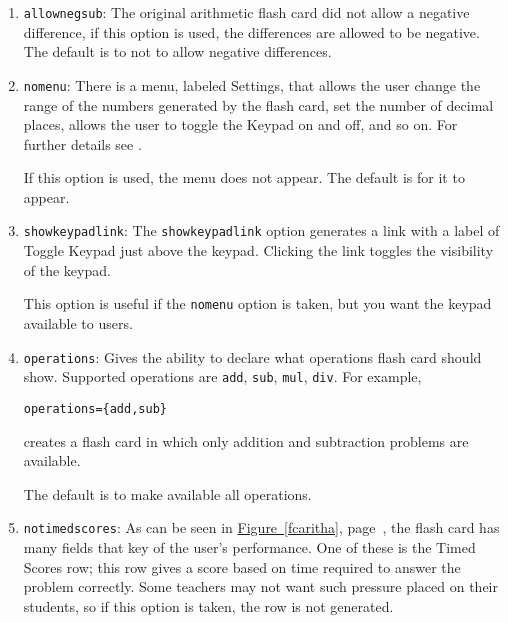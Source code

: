 \documentclass{article}
\let\uif\textsf
\begin{document}
\begin{enumerate}

\item\texttt{allownegsub}: The original arithmetic flash card did not allow
    a negative difference, if this option is used, the differences are
    allowed to be negative. The default is to not to allow negative
    differences.

\item \texttt{nomenu}: There is a menu, labeled \uif{Settings},
    that allows the user change the range of the numbers generated by the
    flash card, set the number of decimal places, allows the user to toggle
    the \uif{Keypad} on and off, and so on. For further details
    see .

     If this option is used, the menu does not appear. The default is for it to appear.

\item \texttt{showkeypadlink}: The \texttt{showkeypadlink} option generates
    a link with a label of \uif{Toggle Keypad} just above the
    keypad. Clicking the link toggles the visibility of the keypad.

    This option is useful if the \texttt{nomenu} option is taken, but
    you want the keypad available to users.

\item \texttt{operations}: Gives the ability to declare what operations
    flash card should show. Supported operations are \texttt{add},
    \texttt{sub}, \texttt{mul}, \texttt{div}. For example,
\begin{Verbatim}[xleftmargin=\amtIndent]
operations={add,sub}
\end{Verbatim}
    creates a flash card in which only addition and subtraction problems
    are available.

    The default is to make available all operations.


\item \texttt{notimedscores}: As can be seen in
    \hyperref[fcaritha]{Figure~\ref*{fcaritha}}, page~\pageref*{fcaritha},
    the flash card has many fields that key of the user's performance. One
    of these is the \uif{Timed Scores} row; this row gives a
    score based on time required to answer the problem correctly. Some
    teachers may not want such pressure placed on their students, so if
    this option is taken, the row is not generated.

\end{enumerate}
\end{document}
